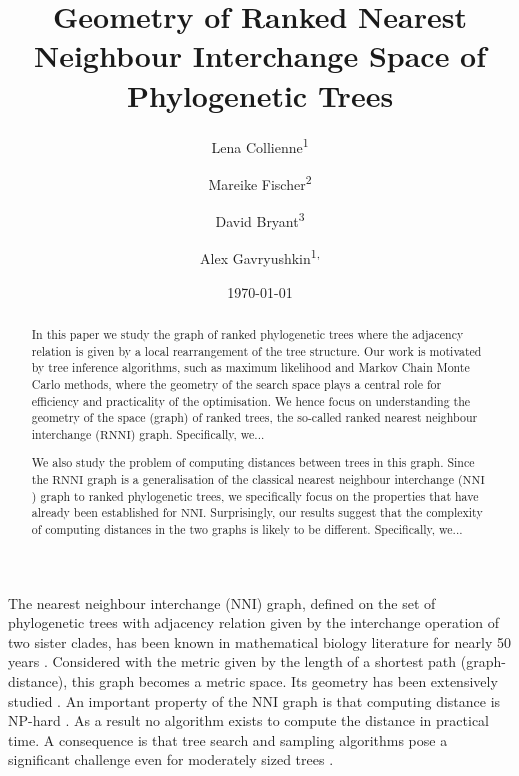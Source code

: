 \documentclass{amsart}
\title[Ranked Nearest Neighbour Intarchange]{Geometry of Ranked Nearest Neighbour Interchange Space of Phylogenetic Trees}
\date{\today}
\author{Lena Collienne\textsuperscript{1}}
\author{Mareike Fischer\textsuperscript{2}}
\author{David Bryant\textsuperscript{3}}
\author{Alex Gavryushkin\textsuperscript{1, \Letter}}
\newcommand{\nni}{\mathrm{NNI}}
\newcommand{\rnni}{\mathrm{RNNI}}
\begin{document}
\begin{abstract}
In this paper we study the graph of ranked phylogenetic trees where the adjacency relation is given by a local rearrangement of the tree structure.
Our work is motivated by tree inference algorithms, such as maximum likelihood and Markov Chain Monte Carlo methods, where the geometry of the search space plays a central role for efficiency and practicality of the optimisation.
We hence focus on understanding the geometry of the space (graph) of ranked trees, the so-called ranked nearest neighbour interchange ($\rnni$) graph.
Specifically, we...

We also study the problem of computing distances between trees in this graph.
Since the $\rnni$ graph is a generalisation of the classical nearest neighbour interchange ($\nni$) graph to ranked phylogenetic trees, we specifically focus on the properties that have already been established for $\nni$.
Surprisingly, our results suggest that the complexity of computing distances in the two graphs is likely to be different.
Specifically, we...
\end{abstract}


\maketitle

The nearest neighbour interchange ($\nni$) graph, defined on the set of phylogenetic trees with adjacency relation given by the interchange operation of two sister clades, has been known in mathematical biology literature for nearly 50 years \autocite{Robinson1971-ql,Moore1973-kk}.
Considered with the metric given by the length of a shortest path (graph-distance), this graph becomes a metric space.
Its geometry has been extensively studied \autocite{Dasgupta2000-xa, Li1996-zw, Gordon2013-fw, De_Jong2016-al}.
An important property of the $\nni$ graph is that computing distance is NP-hard \autocite{Dasgupta2000-xa}.
As a result no algorithm exists to compute the distance in practical time.
A consequence is that tree search and sampling algorithms pose a significant challenge even for moderately sized trees
\autocite{Whidden2016-kl}.
\end{document}
